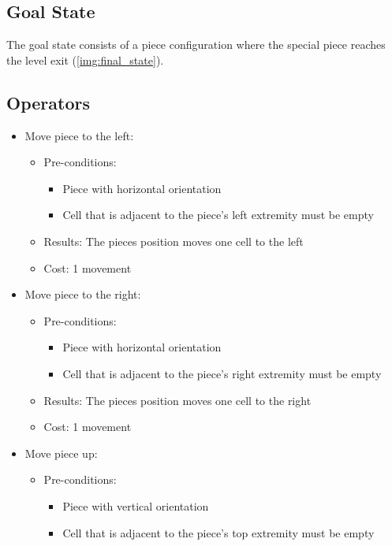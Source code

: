 \documentclass[conference]{IEEEtran}
\begin{document}
\subsection{Goal State} \label{subsec:gs}
The goal state consists of a piece configuration where the special piece reaches the level exit (\autoref{img:final_state}).

\subsection{Operators}
\begin{itemize}
    \item Move piece to the left:
    \begin{itemize}
        \item Pre-conditions:
        \begin{itemize}
            \item Piece with horizontal orientation
            \item Cell that is adjacent to the piece's left extremity must be empty
        \end{itemize}
        \item Results: The pieces position moves one cell to the left
        \item Cost: 1 movement
    \end{itemize}
    \item Move piece to the right:
    \begin{itemize}
        \item Pre-conditions:
        \begin{itemize}
            \item Piece with horizontal orientation
            \item Cell that is adjacent to the piece's right extremity must be empty
        \end{itemize}
        \item Results: The pieces position moves one cell to the right
        \item Cost: 1 movement
    \end{itemize}
    \item Move piece up:
        \begin{itemize}
        \item Pre-conditions:
        \begin{itemize}
            \item Piece with vertical orientation
            \item Cell that is adjacent to the piece's top extremity must be empty

\end{itemize}
\end{itemize}
\end{itemize}
\end{document}

